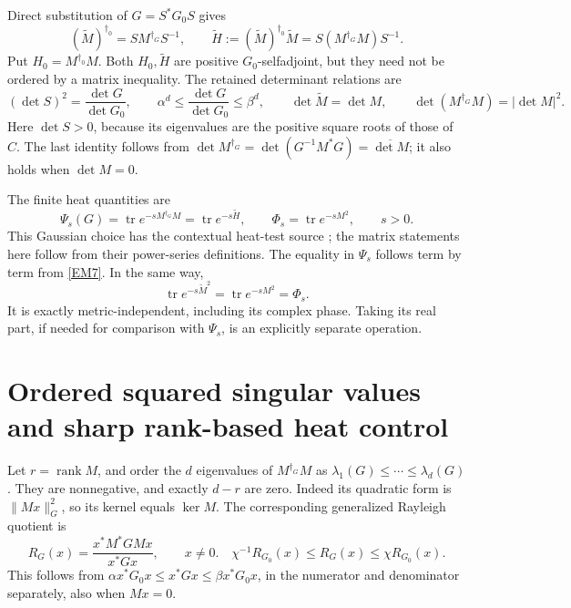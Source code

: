 \documentclass[11pt]{article}
\newcommand{\tr}{\operatorname{tr}}
\newcommand{\rank}{\operatorname{rank}}
\newcommand{\adjzero}{\dagger_0}
\newcommand{\adjg}{\dagger_G}
\begin{document}
Direct substitution of \(G=S^*G_0S\) gives
\begin{equation}
 (\widetilde M)^{\adjzero}=S M^{\adjg}S^{-1},\qquad
 \widetilde H:=(\widetilde M)^{\adjzero}\widetilde M
     =S(M^{\adjg}M)S^{-1}.
 \tag{EM7}\label{EM7}
\end{equation}
Put \(H_0=M^{\adjzero}M\). Both \(H_0,\widetilde H\) are positive
\(G_0\)-selfadjoint, but they need not be ordered by a matrix inequality.
The retained determinant relations are
\begin{equation}
 (\det S)^2=\frac{\det G}{\det G_0},\qquad
 \alpha^d\le\frac{\det G}{\det G_0}\le\beta^d,\qquad
 \det\widetilde M=\det M,\qquad
 \det(M^{\adjg}M)=|\det M|^2.
 \tag{EM8}\label{EM8}
\end{equation}
Here \(\det S>0\), because its eigenvalues are the positive square roots
of those of \(C\). The last identity follows from
\(\det M^{\adjg}=\det(G^{-1}M^*G)=\overline{\det M}\);
it also holds when \(\det M=0\).

The finite heat quantities are
\begin{equation}
 \Psi_s(G)=\tr e^{-sM^{\adjg}M}
          =\tr e^{-s\widetilde H},\qquad
 \Phi_s=\tr e^{-sM^2},\qquad s>0.
 \tag{EM9}\label{EM9}
\end{equation}
This Gaussian choice has the contextual heat-test source
\cite[original-source formula \texttt{ft}]{ConnesHeat}; the matrix
statements here follow from their power-series definitions.
The equality in \(\Psi_s\) follows term by term from \eqref{EM7}.
In the same way,
\begin{equation}
 \tr e^{-s\widetilde M^2}=\tr e^{-sM^2}=\Phi_s.
 \tag{EM10}\label{EM10}
\end{equation}
It is exactly metric-independent, including its complex phase. Taking its
real part, if needed for comparison with \(\Psi_s\), is an explicitly
separate operation.

\section{Ordered squared singular values and sharp rank-based heat control}

Let \(r=\rank M\), and order the \(d\) eigenvalues of \(M^{\adjg}M\) as
\(\lambda_1(G)\le\cdots\le\lambda_d(G)\). They are nonnegative, and
exactly \(d-r\) are zero. Indeed its quadratic form is
\(\|Mx\|_G^2\), so its kernel equals \(\ker M\).
The corresponding generalized Rayleigh quotient is
\begin{equation}
 R_G(x)=\frac{x^*M^*GMx}{x^*Gx},\qquad x\ne0.
 \quad
 \chi^{-1}R_{G_0}(x)\le R_G(x)\le\chi R_{G_0}(x).
 \tag{EM11}\label{EM11}
\end{equation}
This follows from
\(\alpha x^*G_0x\le x^*Gx\le\beta x^*G_0x\), in the numerator and
denominator separately, also when \(Mx=0\).
\end{document}
